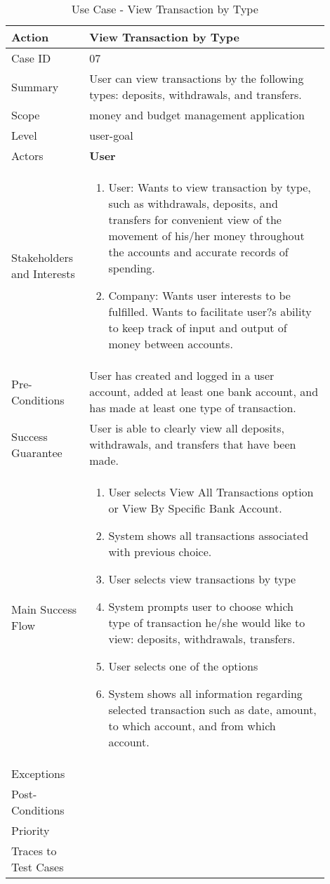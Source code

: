 \documentclass[11pt]{article}
\newcounter{use case ID}
\newcommand\tabularhead[1]{
\begin{table}[ht]
    \addtocounter{use case ID}{1}
    \caption{Use Case \arabic{use case ID} - #1}
    \vspace{0.2cm}
    \begin{tabular}{|p{0.2\linewidth}|p{0.70\linewidth}|}
    \hline
        \textbf{Action} & \textbf{#1} \\
        \hline}
\newcommand\addrow[2]{#1 & #2\\ \hline}
\newcommand\addmulrow[2]{ \begin{minipage}[t][][t]{2.5cm}#1\end{minipage}
        &\begin{minipage}[t][][t]{11cm}
        \begin{enumerate}[itemsep=-1ex] #2   \end{enumerate}
    \end{minipage}\vfill\\ \hline}
\newenvironment{usecase}{\tabularhead}
{\hline\end{tabular}\end{table}}
\begin{document}
\begin{usecase}{View Transaction by Type}
    \addrow{Case ID}{07}
    \addrow{Summary}{User can view transactions by the following types: deposits, withdrawals, and transfers. }
    \addrow{Scope}{money and budget management application}
    \addrow{Level}{user-goal}
    \addrow{Actors}{\textbf{User}}
    \addmulrow{Stakeholders and Interests}{
        \item User: Wants to view transaction by type, such as withdrawals, deposits, and transfers for convenient view of the movement of his/her money throughout the accounts and accurate records of spending.
        \item Company: Wants user interests to be fulfilled. Wants to facilitate user?s ability to keep track of input and output of money between accounts.}
    \addrow{Pre-Conditions}{User has created and logged in a user account, added at least one bank account, and has made at least one type of transaction.}
    \addrow{Success Guarantee}{User is able to clearly view all deposits, withdrawals, and transfers that have been made.}
    \addmulrow{Main Success Flow}{
        \item User selects View All Transactions option or View By Specific Bank Account.
        \item System shows all transactions associated with previous choice.
        \item User selects view transactions by type 
        \item System prompts user to choose which type of transaction he/she would like to view: deposits, withdrawals, transfers.
        \item User selects one of the options
        \item System shows all information regarding selected transaction such as date, amount, to which account, and from which account.}
    \addrow{Exceptions}{}
    \addrow{Post-Conditions}{}
    \addrow{Priority}{}
    \addrow{Traces to Test Cases}{}
\end{usecase}
\end{document}
